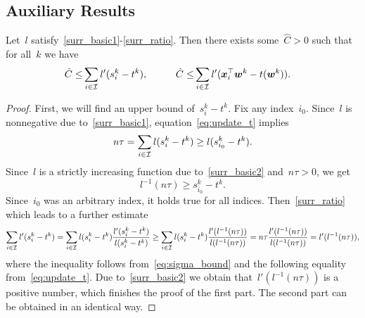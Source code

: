 \subsection{Auxiliary Results}\label{app:sgd3}

\begin{lemma}\label{lemma:bound_zero}
  Let~$l$ satisfy~\ref{surr_basic1}-\ref{surr_ratio}. Then there exists some~$\hat{C} > 0$ such that for all~$k$ we have
  \begin{align*}
    \hat{C} \leq & \sum_{i \in \mathcal{I}} l'(s_i^k - t^k), \quad & \quad
    \hat{C} \leq & \sum_{i \in \mathcal{I}} l'(\bm{x}_i^\top \bm{w}^k - t(\bm{w}^k)).
  \end{align*}
\end{lemma}
\begin{proof}
  First, we will find an upper bound of~$s_i^k-t^k$. Fix any index~$i_0$. Since~$l$ is nonnegative due to~\ref{surr_basic1}, equation~\eqref{eq:update_t} implies
  \begin{equation*}
    n\tau = \sum_{i \in \mathcal{I}} l(s_i^k - t^k) \geq l(s_{i_0}^k - t^k).
  \end{equation*}
  Since~$l$ is a strictly increasing function due to~\ref{surr_basic2} and~$n\tau>0$, we get 
  \begin{equation}\label{eq:sigma_bound}
    l^{-1}(n\tau) \geq s_{i_0}^k-t^k.
  \end{equation}
  Since~$i_0$ was an arbitrary index, it holds true for all indices. Then~\ref{surr_ratio} which leads to a further estimate
  \begin{equation*}
    \sum_{i \in \mathcal{I}} l'(s_i^k - t^k)
      = \sum_{i\in \mathcal{I}} l(s_i^k-t^k) \frac{l'(s_i^k-t^k)}{l(s_i^k-t^k)}
      \geq \sum_{i \in \mathcal{I}} l(s_i^k - t^k) \frac{l'(l^{-1}(n\tau))}{l(l^{-1}(n\tau))}
      = n\tau \frac{l'(l^{-1}(n\tau))}{l(l^{-1}(n\tau))}
      = l'(l^{-1}(n\tau)),
  \end{equation*}
  where the inequality follows from~\eqref{eq:sigma_bound} and the following equality from~\eqref{eq:update_t}. Due to~\ref{surr_basic2} we obtain that~$l'(l^{-1}(n\tau))$ is a positive number, which finishes the proof of the first part. The second part can be obtained in an identical way.
\end{proof}

\pagebreak

